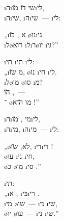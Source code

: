 \begin{twocol}
\begin{stanza}
 \i{ה}\i{שי} \u{דו} \u{מו}\i{לי},\\
\i{ה}\i{שי}, \i{ה}\i{שי}~—   \i{לי}:
\end{stanza}

\begin{stanza}
„\i{א} ,   \u{כו} \o{נו}\i{גי}\\
\i{ל}\o{רוא} \i{ל}\i{ר}\o{יו}  \i{גי}?”
\end{stanza}

\begin{stanza}
\i{תי}  \i{תי} \i{לי}:\\
„\i{מ}  \u{שו}, \o{נו} \i{חי} \i{לי}.\\
   \i{ל}\o{מו}  \o{סו} \i{מ}?\\
 \u{הו} ,~—\\
־ \o{מו} \u{הוא} !”
\end{stanza}

\begin{stanza}
 \i{ה}\i{מי} , \u{מו}\i{לי},\\
\i{ה}\i{מי}, \i{ה}\i{מי}~—   \i{לי}:
\end{stanza}

\begin{stanza}
„\o{לא},   \u{שו}, \i{די}\i{די} !\\
  \o{עו} \i{ני} \i{חי},\\
\o{כ} \o{מו}  \i{סי}  .”
\end{stanza}

\begin{stanza}
\i{תי}:\\
„\i{א} ,  \i{בּי}\i{רי} .\\
\i{מי}  \o{שו}~— \i{ני} \i{שי},\\
\o{יו}  \o{עו}~— \i{ני} \i{שי}.”
\end{stanza}


\end{twocol}
